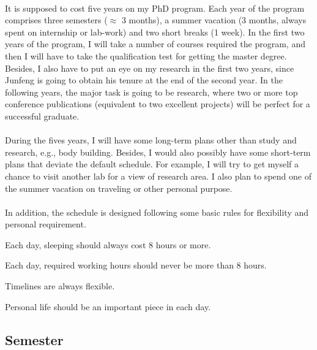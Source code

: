 \paragraph{} It is supposed to cost five years on my PhD program. Each year of the program comprises three semesters ($\approx$ 3 months), a summer vacation (3 months, always spent on internship or lab-work) and two short breaks (1 week). In the first two years of the program, I will take a number of courses required the program, and then I will have to take the qualification test for getting the master degree. Besides, I also have to put an eye on my research in the first two years, since Junfeng is going to obtain his tenure at the end of the second year. In the following years, the major task is going to be research, where two or more top conference publications (equivalent to two excellent projects) will be perfect for a successful graduate.

\paragraph{} During the fives years, I will have some long-term plans other than study and research, e.g., body building. Besides, I would also possibly have some short-term plans that deviate the default schedule. For example, I will try to get myself a chance to visit another lab for a view of research area. I also plan to spend one of the summer vacation on traveling or other personal purpose.

\paragraph{} In addition, the schedule is designed following some basic rules for flexibility and personal requirement.
\begin{itemize*}
\item Each day, sleeping should always cost 8 hours or more.
\item Each day, required working hours should never be more than 8 hours.
\item Timelines are always flexible.
\item Personal life should be an important piece in each day.
\end{itemize*}

\subsection{Semester}

